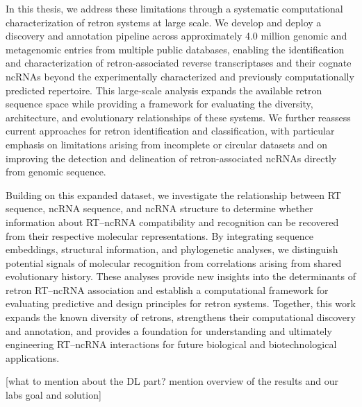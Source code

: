 In this thesis, we address these limitations through a systematic computational characterization of retron systems at large scale. We develop and deploy a discovery and annotation pipeline across approximately 4.0 million genomic and metagenomic entries from multiple public databases, enabling the identification and characterization of retron-associated reverse transcriptases and their cognate ncRNAs beyond the experimentally characterized  and previously computationally predicted repertoire. This large-scale analysis expands the available retron sequence space while providing a framework for evaluating the diversity, architecture, and evolutionary relationships of these systems. We further reassess current approaches for retron identification and classification, with particular emphasis on limitations arising from incomplete or circular datasets and on improving the detection and delineation of retron-associated ncRNAs directly from genomic sequence.

Building on this expanded dataset, we investigate the relationship between RT sequence, ncRNA sequence, and ncRNA structure to determine whether information about RT--ncRNA compatibility and recognition can be recovered from their respective molecular representations. By integrating sequence embeddings, structural information, and phylogenetic analyses, we distinguish potential signals of molecular recognition from correlations arising from shared evolutionary history. These analyses provide new insights into the determinants of retron RT--ncRNA association and establish a computational framework for evaluating predictive and design principles for retron systems. Together, this work expands the known diversity of retrons, strengthens their computational discovery and annotation, and provides a foundation for understanding and ultimately engineering RT--ncRNA interactions for future biological and biotechnological applications.


[what to mention about the DL part? mention overview of the results and our labs goal and solution]

